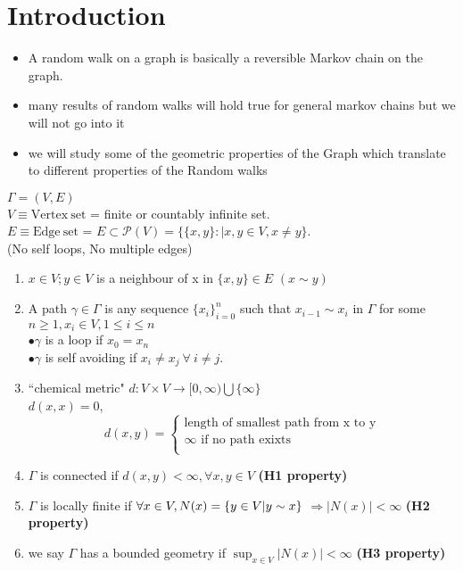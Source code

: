 \documentclass[main]{subfiles}
\begin{document}


\section{Introduction}

\begin{itemize}
  \item {A random walk on a graph is basically a reversible Markov chain on the graph.}
  \item {many results of random walks will hold true for general markov chains but we will not go into it}
  \item {we will study some of the geometric properties of the Graph which translate to different properties of the Random walks}
\end{itemize}
$\Gamma=(V,E)$\\
$V \equiv \mathrm{Vertex~ set} $ = finite or countably infinite set.\\
$E \equiv \mathrm{Edge ~set} $ = $E \subset \mathcal{P}(V) = \{ \{x,y\}:|x,y \in V,x\neq y \} $.\\(No self loops, No multiple edges)

\begin{enumerate}

  \item $x \in V;y \in V$ is a neighbour of x in $ \{x,y\} \in E$ $(x \sim y)$

  \item A path $\gamma \in \Gamma $ is any sequence $\{x_{i}\}_{i=0} ^{n}$  such that $x_{i-1} \sim x_{i}$ in $\Gamma$ for some $n\geq1,x_{i} \in V,1\leq i \leq n $\\
        $ \bullet \gamma$ is a loop if $x_{0}=x_{n}$\\
        $ \bullet \gamma$ is self avoiding if $x_{i}\neq x_{j} ~\forall~ i\neq j $.

  \item ``chemical metric" $ d:V\times V \longrightarrow [0,\infty)\bigcup\{\infty\} $\\
        $d(x,x)=0$,
        \begin{equation*}
          d(x,y)=
          \begin{cases}
            \text{length of smallest path from x to y} \\
            \infty \text{ if no path exixts}           \\
          \end{cases}
        \end{equation*}
  \item $\Gamma$ is connected if $d(x,y)<\infty,\forall x,y \in V$ \textbf{(H1 property)}
        \item$\Gamma$ is locally finite if $\forall x \in V ,\\ N(x) =\{y \in V |y \sim x\} $
        $\Rightarrow |N(x)| < \infty $ \textbf{(H2 property)}
  \item  we say $\Gamma$ has a bounded geometry if $\sup_{x\in V} |N(x)| < \infty $ \textbf{(H3 property)}
\end{enumerate}
\end{document}

